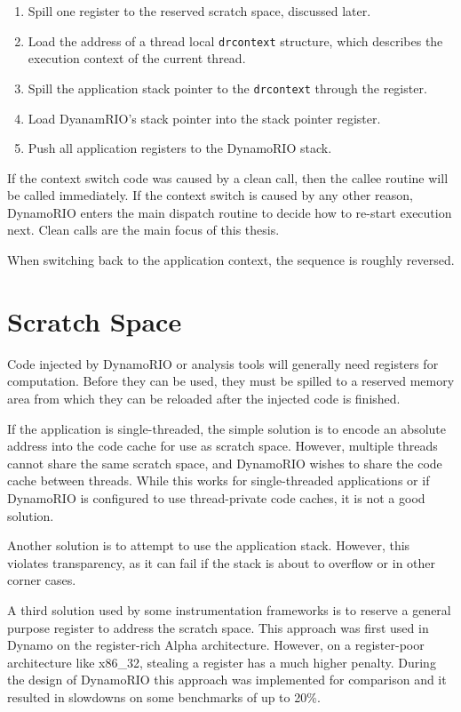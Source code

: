 \begin{enumerate}
\item Spill one register to the reserved scratch space, discussed later.  %
\item Load the address of a thread local {\tt drcontext} structure, which
describes the execution context of the current thread.
\item Spill the application stack pointer to the {\tt drcontext} through the
register.
\item Load DyanamRIO's stack pointer into the stack pointer register.
\item Push all application registers to the DynamoRIO stack.
\end{enumerate}

If the context switch code was caused by a clean call, then the callee routine
will be called immediately.  If the context switch is caused by any other
reason, DynamoRIO enters the main dispatch routine to decide how to re-start
execution next.  Clean calls are the main focus of this thesis.

When switching back to the application context, the sequence is roughly
reversed.

\section{Scratch Space}


Code injected by DynamoRIO or analysis tools will generally need registers for
computation.  Before they can be used, they must be spilled to a reserved memory
area from which they can be reloaded after the injected code is finished.

If the application is single-threaded, the simple solution is to encode an
absolute address into the code cache for use as scratch space.  However,
multiple threads cannot share the same scratch space, and DynamoRIO wishes to
share the code cache between threads.  While this works for single-threaded
applications or if DynamoRIO is configured to use thread-private code caches, it
is not a good solution.

Another solution is to attempt to use the application stack.  However, this
violates transparency, as it can fail if the stack is about to overflow or in
other corner cases.

A third solution used by some instrumentation frameworks is to reserve a general
purpose register to address the scratch space.  This approach was first used in
Dynamo on the register-rich Alpha architecture.\cite{dynamo}  However, on a
register-poor architecture like x86\_32, stealing a register has a much higher
penalty.  During the design of DynamoRIO this approach was implemented for
comparison and it resulted in slowdowns on some benchmarks of up to 20\%.

